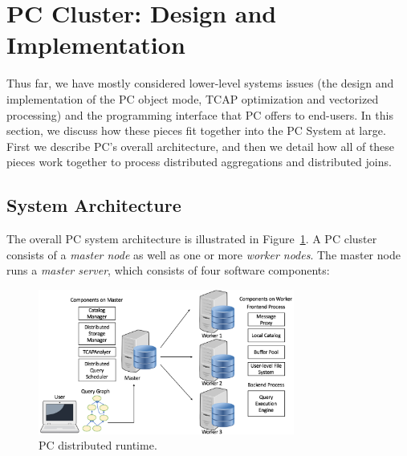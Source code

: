 
\section{PC Cluster: Design and Implementation}
\label{sec:implementation}

Thus far, we have mostly considered lower-level systems issues (the design and implementation of the PC object mode, TCAP optimization and vectorized processing) and
the programming interface that PC offers to end-users.  In this section, we discuss how these pieces fit together into the PC System at large.  First we 
describe PC's overall architecture, and then we detail how all of these pieces work together to process distributed aggregations and distributed joins.

\subsection{System Architecture}

The overall PC system architecture is illustrated in Figure~\ref{fig:arch}.
A PC cluster consists of a \emph{master node} as well as one or more \emph{worker nodes}.
The master node runs a \emph{master server}, which consists of
four software components: 

\begin{figure}
\centering
\includegraphics[width=0.75\textwidth]{arch.pdf}
  \caption{\label{fig:arch} PC distributed runtime.}
\end{figure}


